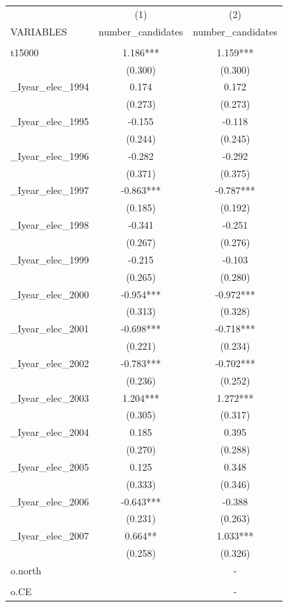 \documentclass[]{article}
\begin{document}
\begin{tabular}{lcc} \hline
 & (1) & (2) \\
VARIABLES & number\_candidates & number\_candidates \\ \hline
 &  &  \\
t15000 & 1.186*** & 1.159*** \\
 & (0.300) & (0.300) \\
\_Iyear\_elec\_1994 & 0.174 & 0.172 \\
 & (0.273) & (0.273) \\
\_Iyear\_elec\_1995 & -0.155 & -0.118 \\
 & (0.244) & (0.245) \\
\_Iyear\_elec\_1996 & -0.282 & -0.292 \\
 & (0.371) & (0.375) \\
\_Iyear\_elec\_1997 & -0.863*** & -0.787*** \\
 & (0.185) & (0.192) \\
\_Iyear\_elec\_1998 & -0.341 & -0.251 \\
 & (0.267) & (0.276) \\
\_Iyear\_elec\_1999 & -0.215 & -0.103 \\
 & (0.265) & (0.280) \\
\_Iyear\_elec\_2000 & -0.954*** & -0.972*** \\
 & (0.313) & (0.328) \\
\_Iyear\_elec\_2001 & -0.698*** & -0.718*** \\
 & (0.221) & (0.234) \\
\_Iyear\_elec\_2002 & -0.783*** & -0.702*** \\
 & (0.236) & (0.252) \\
\_Iyear\_elec\_2003 & 1.204*** & 1.272*** \\
 & (0.305) & (0.317) \\
\_Iyear\_elec\_2004 & 0.185 & 0.395 \\
 & (0.270) & (0.288) \\
\_Iyear\_elec\_2005 & 0.125 & 0.348 \\
 & (0.333) & (0.346) \\
\_Iyear\_elec\_2006 & -0.643*** & -0.388 \\
 & (0.231) & (0.263) \\
\_Iyear\_elec\_2007 & 0.664** & 1.033*** \\
 & (0.258) & (0.326) \\
o.north &  & - \\
 &  &  \\
o.CE &  & - \\

\end{tabular}
\end{document}
